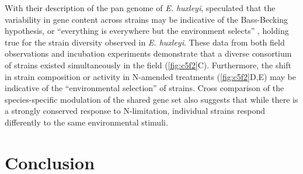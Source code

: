 With their description of the pan genome of \textit{E. huxleyi}, \citet{Read2013} speculated that the variability in gene content across strains may be indicative of the Bass-Becking hypothesis, or ``everything is everywhere but the environment selects'' \citep{Baas-Becking1934, DeWit2006}, holding true for the strain diversity observed in \textit{E. huxleyi}.  These data from both field observations and incubation experiments demonstrate that a diverse consortium of strains existed simultaneously in the field (\cref{fig:c5f2}C). Furthermore, the shift in strain composition or activity in N-amended treatments (\cref{fig:c5f2}D,E) may be indicative of the ``environmental selection'' of strains. Cross comparison of the species-specific modulation of the shared gene set also suggests that while there is a strongly conserved response to N-limitation, individual strains respond differently to the same environmental stimuli. \par


\section{Conclusion}

